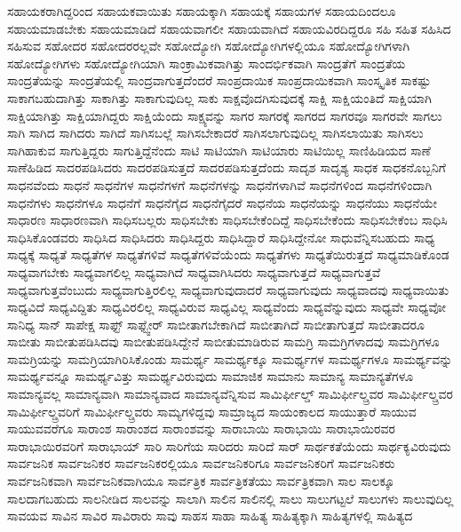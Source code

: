 {ಸಹಾಯಕರಾಗಿದ್ದರಿಂದ
ಸಹಾಯಕವಾಯಿತು
ಸಹಾಯಕ್ಕಾಗಿ
ಸಹಾಯಕ್ಕೆ
ಸಹಾಯಗಳ
ಸಹಾಯದಿಂದಲೂ
ಸಹಾಯಮಾಡಬೇಕು
ಸಹಾಯಮಾಡಿದೆ
ಸಹಾಯವಾಗಲೀ
ಸಹಾಯವಾಗಿದೆ
ಸಹಾಯವಿರದಿದ್ದರೂ
ಸಹಿ
ಸಹಿತ
ಸಹಿಸಿದ
ಸಹಿಸುವ
ಸಹೋದರ
ಸಹೋದರರಲ್ಲವೇ
ಸಹೋದ್ಯೋಗಿ
ಸಹೋದ್ಯೋಗಿಗಳಲ್ಲಿಯೂ
ಸಹೋದ್ಯೋಗಿಗಳಾಗಿ
ಸಹೋದ್ಯೋಗಿಗಳು
ಸಹೋದ್ಯೋಗಿಯಾಗಿ
ಸಾಂಕ್ರಾಮಿಕವಾಗಿತ್ತು
ಸಾಂದರ್ಭಿಕವಾಗಿ
ಸಾಂದ್ರತೆಗೆ
ಸಾಂದ್ರತೆಯ
ಸಾಂದ್ರತೆಯನ್ನು
ಸಾಂದ್ರತೆಯಲ್ಲಿ
ಸಾಂದ್ರವಾಗುತ್ತದೆಂದರೆ
ಸಾಂಪ್ರದಾಯಿಕ
ಸಾಂಪ್ರದಾಯಿಕವಾಗಿ
ಸಾಂಸ್ಕೃತಿಕ
ಸಾಕಷ್ಟು
ಸಾಕಾಗಬಹುದಾಗಿತ್ತು
ಸಾಕಾಗಿತ್ತು
ಸಾಕಾಗುವುದಿಲ್ಲ
ಸಾಕು
ಸಾಕ್ಷವೊದಗಿಸುವುದಕ್ಕೆ
ಸಾಕ್ಷಿ
ಸಾಕ್ಷಿಯಂತಿದೆ
ಸಾಕ್ಷಿಯಾಗಿ
ಸಾಕ್ಷಿಯಾಗಿತ್ತು
ಸಾಕ್ಷಿಯಾಗಿದ್ದರು
ಸಾಕ್ಷಿಯೆಂದು
ಸಾಕ್ಷ್ಯವನ್ನು
ಸಾಗರ
ಸಾಗರಕ್ಕೆ
ಸಾಗರದ
ಸಾಗರವೂ
ಸಾಗರವೇ
ಸಾಗಲು
ಸಾಗಿ
ಸಾಗಿದ
ಸಾಗಿದರು
ಸಾಗಿದೆ
ಸಾಗಿಸಬಲ್ಲೆ
ಸಾಗಿಸಬೇಕಾದರೆ
ಸಾಗಿಸಲಾಗುವುದಿಲ್ಲ
ಸಾಗಿಸಲಾಯಿತು
ಸಾಗಿಸಲು
ಸಾಗಿಹಾಕುವ
ಸಾಗುತ್ತಿದ್ದರು
ಸಾಗುತ್ತಿದ್ದೆನೆಂದು
ಸಾಟಿ
ಸಾಟಿಯಾಗಿ
ಸಾಟಿಯಾರು
ಸಾಟಿಯಿಲ್ಲ
ಸಾಣಿಹಿಡಿಯದ
ಸಾಣೆ
ಸಾಣೆಹಿಡಿದ
ಸಾದರಪಡಿಸಿದರು
ಸಾದರಪಡಿಸುತ್ತದೆ
ಸಾದರಪಡಿಸುತ್ತದೆಂದು
ಸಾದೃಶ
ಸಾದೃಶ್ಯ
ಸಾಧಕ
ಸಾಧಕನೊಬ್ಬನಿಗೆ
ಸಾಧನವೆಂದು
ಸಾಧನೆ
ಸಾಧನೆಗಳ
ಸಾಧನೆಗಳಗೆ
ಸಾಧನೆಗಳನ್ನು
ಸಾಧನೆಗಳಾಗಿವೆ
ಸಾಧನೆಗಳಿಂದ
ಸಾಧನೆಗಳಿಂದಾಗಿ
ಸಾಧನೆಗಳು
ಸಾಧನೆಗಳೂ
ಸಾಧನೆಗೆ
ಸಾಧನೆಗೈದ
ಸಾಧನೆಗೈದರೆ
ಸಾಧನೆಯ
ಸಾಧನೆಯನ್ನು
ಸಾಧನೆಯು
ಸಾಧನೆಯೇ
ಸಾಧಾರಣ
ಸಾಧಾರಣವಾಗಿ
ಸಾಧಿಸಬಲ್ಲರು
ಸಾಧಿಸಬೇಕು
ಸಾಧಿಸಬೇಕೆಂದಿದ್ದೆ
ಸಾಧಿಸಬೇಕೆಂದು
ಸಾಧಿಸಬೇಕೆಂಬ
ಸಾಧಿಸಿ
ಸಾಧಿಸಿಕೊಂಡವರು
ಸಾಧಿಸಿದ
ಸಾಧಿಸಿದರು
ಸಾಧಿಸಿದ್ದರು
ಸಾಧಿಸಿದ್ದಾರೆ
ಸಾಧಿಸಿದ್ದೇನೋ
ಸಾಧುವೆನ್ನಿಸಬಹುದು
ಸಾಧ್ಯ
ಸಾಧ್ಯಕ್ಕೆ
ಸಾಧ್ಯತೆ
ಸಾಧ್ಯತೆಗಳ
ಸಾಧ್ಯತೆಗಳಿವೆ
ಸಾಧ್ಯತೆಗಳಿವೆಯೆಂದು
ಸಾಧ್ಯತೆಗಳು
ಸಾಧ್ಯತೆಯಿರುತ್ತದೆ
ಸಾಧ್ಯಮಾಡಿಕೊಂಡ
ಸಾಧ್ಯವಾಗಬೇಕು
ಸಾಧ್ಯವಾಗಲಿಲ್ಲ
ಸಾಧ್ಯವಾಗಿದೆ
ಸಾಧ್ಯವಾಗಿಸಿದರು
ಸಾಧ್ಯವಾಗುತ್ತದೆ
ಸಾಧ್ಯವಾಗುತ್ತವೆ
ಸಾಧ್ಯವಾಗುತ್ತವೆಂಬುದು
ಸಾಧ್ಯವಾಗುತ್ತಿರಲಿಲ್ಲ
ಸಾಧ್ಯವಾಗುವುದಾದರೆ
ಸಾಧ್ಯವಾಗುವುದು
ಸಾಧ್ಯವಾದವು
ಸಾಧ್ಯವಾಯಿತು
ಸಾಧ್ಯವಿದೆ
ಸಾಧ್ಯವಿದ್ದಿತು
ಸಾಧ್ಯವಿರಲಿಲ್ಲ
ಸಾಧ್ಯವಿರುವ
ಸಾಧ್ಯವಿಲ್ಲ
ಸಾಧ್ಯವೆಂದು
ಸಾಧ್ಯವೆನ್ನುವುದು
ಸಾಧ್ಯವೇ
ಸಾಧ್ಯವೋ
ಸಾನಿಧ್ಯ
ಸಾನ್
ಸಾಪೇಕ್ಷ
ಸಾಫ್ಟ್
ಸಾಫ್ಟ್ವೇರ್
ಸಾಬೀತಾಗಬೇಕಾಗಿದೆ
ಸಾಬೀತಾಗಿದೆ
ಸಾಬೀತಾಗುತ್ತದೆ
ಸಾಬೀತಾದರೂ
ಸಾಬೀತು
ಸಾಬೀತುಪಡಿಸಿದವು
ಸಾಬೀತುಪಡಿಸಿದ್ದೇನೆ
ಸಾಬೀತುಮಾಡಿರುವ
ಸಾಮಗ್ರಿ
ಸಾಮಗ್ರಿಗಳಾದವು
ಸಾಮಗ್ರಿಗಳೂ
ಸಾಮಗ್ರಿಯನ್ನು
ಸಾಮಗ್ರಿಯಾಗಿರಿಸಿಕೊಂಡು
ಸಾಮರ್ಥ್ಯ
ಸಾಮರ್ಥ್ಯಕ್ಕೂ
ಸಾಮರ್ಥ್ಯಗಳ
ಸಾಮರ್ಥ್ಯಗಳೂ
ಸಾಮರ್ಥ್ಯವನ್ನು
ಸಾಮರ್ಥ್ಯವನ್ನೂ
ಸಾಮರ್ಥ್ಯವಿತ್ತು
ಸಾಮರ್ಥ್ಯವಿರುವುದು
ಸಾಮಾಜಿಕ
ಸಾಮಾನು
ಸಾಮಾನ್ಯ
ಸಾಮಾನ್ಯತೆಗಳೂ
ಸಾಮಾನ್ಯವಲ್ಲ
ಸಾಮಾನ್ಯವಾಗಿ
ಸಾಮಾನ್ಯವಾದ
ಸಾಮಾನ್ಯವೆನ್ನಿಸುವ
ಸಾಮಿರ್ಫೀಲ್ಡ್
ಸಾಮಿರ್ಫೀಲ್ಡ್ರವರ
ಸಾಮಿರ್ಫೀಲ್ಡ್ರವರ
ಸಾಮಿರ್ಫೀಲ್ಡ್ರವರಿಗೆ
ಸಾಮಿರ್ಫೀಲ್ಡ್ರವರು
ಸಾಮ್ಯಗಳಿದ್ದವು
ಸಾಮ್ರಾಜ್ಯದ
ಸಾಯಂಕಾಲದ
ಸಾಯುತ್ತಾರೆ
ಸಾಯುವ
ಸಾಯುವವರೆಗೂ
ಸಾರಾಂಶ
ಸಾರಾಂಶದ
ಸಾರಾಂಶವನ್ನು
ಸಾರಾಬಾಯಿ
ಸಾರಾಭಾಯಿ
ಸಾರಾಭಾಯಿರವರ
ಸಾರಾಭಾಯಿರವರಿಗೆ
ಸಾರಾಭಾಯ್
ಸಾರಿ
ಸಾರಿಗೆಯ
ಸಾರಿದರು
ಸಾರಿದೆ
ಸಾರ್
ಸಾರ್ಥಕತೆಯೆಂದು
ಸಾರ್ಥಕ್ಯವಿರುವುದು
ಸಾರ್ವಜನಿಕ
ಸಾರ್ವಜನಿಕರ
ಸಾರ್ವಜನಿಕರಲ್ಲಿಯೂ
ಸಾರ್ವಜನಿಕರಿಗೂ
ಸಾರ್ವಜನಿಕರಿಗೆ
ಸಾರ್ವಜನಿಕರು
ಸಾರ್ವಜನಿಕವಾಗಿ
ಸಾರ್ವಜನಿಕವಾಗಿಯೂ
ಸಾರ್ವತ್ರಿಕ
ಸಾರ್ವತ್ರಿಕತೆಯು
ಸಾರ್ವತ್ರಿಕವಾಗಿ
ಸಾಲ
ಸಾಲಕ್ಕೂ
ಸಾಲದಾಗಬಹುದು
ಸಾಲನೀಡಿದ
ಸಾಲವನ್ನು
ಸಾಲಾಗಿ
ಸಾಲಿನ
ಸಾಲಿನಲ್ಲಿ
ಸಾಲು
ಸಾಲುಗಟ್ಟಲೆ
ಸಾಲುಗಳು
ಸಾಲುವುದಿಲ್ಲ
ಸಾವಯವ
ಸಾವಿನ
ಸಾವಿರ
ಸಾವಿರಾರು
ಸಾವು
ಸಾಹಸ
ಸಾಹಾ
ಸಾಹಿತ್ಯ
ಸಾಹಿತ್ಯಕ್ಕಾಗಿ
ಸಾಹಿತ್ಯಗಳಲ್ಲಿ
ಸಾಹಿತ್ಯದ
}
